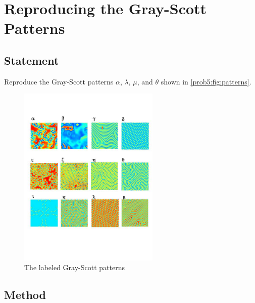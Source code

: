 \section{Reproducing the Gray-Scott Patterns}

\subsection{Statement}
Reproduce the Gray-Scott patterns $\alpha$, $\lambda$, $\mu$, and $\theta$ shown in \autoref{prob5:fig:patterns}.

\begin{figure}[H]
    \centering
    \includegraphics[width=0.6\textwidth]{figures/reactions/patterns.jpg}
    \caption{The labeled Gray-Scott patterns}\label{prob5:fig:patterns}
\end{figure}

\subsection{Method}

